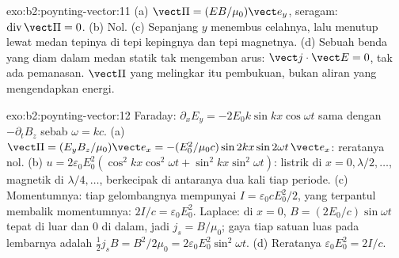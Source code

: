\begin{solution}{exo:b2:poynting-vector:11}
(a) $\vect\Pi = (EB/\mu_0)\vect e_y$, seragam: $\operatorname{div}\vect\Pi = 0$. (b) Nol.
(c) Sepanjang $y$ menembus celahnya, lalu menutup lewat medan tepinya di
tepi kepingnya dan tepi magnetnya. (d) Sebuah benda yang diam dalam medan
statik tak mengemban arus: $\vect j\cdot\vect E = 0$, tak ada pemanasan. $\vect\Pi$
yang melingkar itu pembukuan, bukan aliran yang mengendapkan energi.
\end{solution}

\begin{solution}{exo:b2:poynting-vector:12}
Faraday: $\partial_xE_y = -2E_0k\sin kx\cos\omega t$ sama dengan $-\partial_tB_z$ sebab
$\omega = kc$. (a)
$\vect\Pi = (E_yB_z/\mu_0)\vect e_x = -(E_0^2/\mu_0c)\sin2kx\sin2\omega t\,\vect e_x$: reratanya
nol. (b) $u = 2\varepsilon_0E_0^2(\cos^2kx\cos^2\omega t + \sin^2kx\sin^2\omega t)$: listrik
di $x = 0, \lambda/2, \dots$, magnetik di $\lambda/4, \dots$, berkecipak di antaranya
dua kali tiap periode. (c) Momentumnya: tiap gelombangnya mempunyai $I = \varepsilon_0cE_0^2/2$, yang
terpantul membalik momentumnya: $2I/c = \varepsilon_0E_0^2$. Laplace: di $x =
0$, $B = (2E_0/c)\sin\omega t$ tepat di luar dan $0$ di dalam, jadi $j_s = B/\mu_0$;
gaya tiap satuan luas pada lembarnya adalah $\tfrac12j_sB = B^2/2\mu_0 = 2\varepsilon_0E_0^2\sin^2
\omega t$. (d) Reratanya $\varepsilon_0E_0^2 = 2I/c$.
\end{solution}

